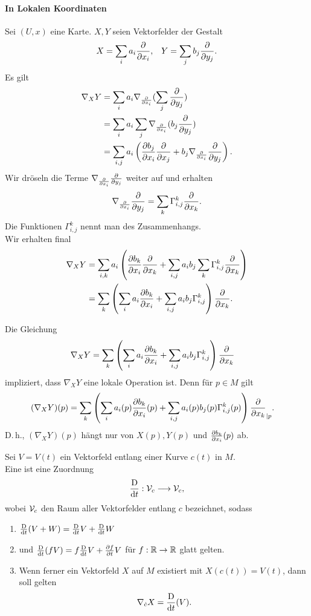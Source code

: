 \paragraph{In Lokalen Koordinaten} Sei $(U,x)$ eine Karte. $X,Y$ seien Vektorfelder der Gestalt
\begin{align*}
X = \sum_ia_i \frac{\partial }{\partial x_i}, && Y = \sum_j b_j\frac{\partial }{\partial y_j}.
\end{align*}
Es gilt
\begin{align*}
\nabla_XY &= \sum_ia_i \nabla_{\frac{\partial }{\partial x_i}} (\sum_j \frac{\partial }{\partial y_j})\\
&= \sum_ia_i\sum_j \nabla_{\frac{\partial }{\partial x_i}} (b_j \frac{\partial }{\partial y_j})\\
&= \sum_{i,j} a_i 
\left(
\frac{\partial b_j}{\partial x_i} \frac{\partial }{\partial x_j} + b_j \nabla_{\frac{\partial }{\partial x_i}} \frac{\partial }{\partial y_j} 
\right).
\end{align*}
Wir dröseln die Terme $\nabla_{\frac{\partial }{\partial x_i}} \frac{\partial }{\partial y_j}$ weiter auf und erhalten
\begin{align*}
\nabla_{\frac{\partial }{\partial x_i}} \frac{\partial }{\partial y_j}  = \sum_k \Gamma_{i,j}^k \frac{\partial }{\partial x_k}.
\end{align*}
Die Funktionen $\Gamma_{i,j}^k$ nennt man  des Zusammenhangs.\\
Wir erhalten final
\begin{align*}
\nabla_XY &= \sum_{i,k} a_i 
\left(
\frac{\partial b_k}{\partial x_i} \frac{\partial }{\partial x_k} +\sum_{i,j} a_i b_j \sum_k \Gamma_{i,j}^k \frac{\partial }{\partial x_k} 
\right)\\
&= \sum_k \left(
\sum_i  a_i \frac{\partial b_k}{\partial x_i}
+
\sum_{i,j} a_i b_j \Gamma_{i,j}^k
\right)
\frac{\partial }{\partial x_k}.
\end{align*}

\Bem{}
Die Gleichung
\begin{align*}
\nabla_XY &= \sum_k \left(
	\sum_i  a_i \frac{\partial b_k}{\partial x_i}
	+
	\sum_{i,j} a_i b_j \Gamma_{i,j}^k
\right)
\frac{\partial }{\partial x_k}
\end{align*}
impliziert, dass $\nabla_X Y$ eine lokale Operation ist. Denn für $p \in M$ gilt
\begin{align*}
(\nabla_XY)(p) &= \sum_k \left(
\sum_i a_i(p) \frac{\partial b_k}{\partial x_i}(p)
+ \sum_{i,j} a_i(p) b_j(p) \Gamma_{i,j}^k(p)
\right)\frac{\partial }{\partial x_k}_{|p}.
\end{align*}
D.\,h., $(\nabla_XY)(p)$ hängt nur von $X(p), Y(p)$ und $\frac{\partial b_k}{\partial x_i}(p)$ ab.

\newcommand{\Dd}[1]{\frac{\text{D}}{\d #1}}
\Def{}
Sei $V = V(t)$ ein Vektorfeld entlang einer Kurve $c(t)$ in $M$.\\
Eine  ist eine Zuordnung
\[ \Dd{t} : \V_c \Pfeil{} \V_c, \]
wobei $\mathcal{V}_c$ den Raum aller Vektorfelder entlang $c$ bezeichnet, sodass
\begin{enumerate}[(1)]
	\item $\Dd{t}(V+W) = \Dd{t}V + \Dd{t} W$
	\item und $\Dd{t}(fV) = f \Dd{t} V + \pf{f}{t} V$ für $f : \mathbb{R} \overset{}{\rightarrow}\mathbb{R}$ glatt gelten.
	\item Wenn ferner ein Vektorfeld $X$ auf $M$ existiert mit $X(c(t)) = V(t)$, dann soll gelten
	\[ \nabla_{\dot{c}}X = \Dd{t}(V) .\]
\end{enumerate}


